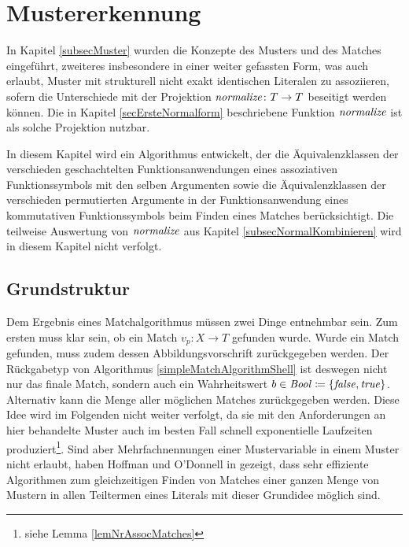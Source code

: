 

\chapter{Mustererkennung} \label{secPattermatching}

In Kapitel \ref{subsecMuster} wurden die Konzepte des Musters und des Matches eingeführt, zweiteres insbesondere in einer weiter gefassten Form, was auch erlaubt, Muster mit strukturell nicht exakt identischen Literalen zu assoziieren, sofern die Unterschiede mit der Projektion $\mathit{normalize} \colon T \rightarrow T$ beseitigt werden können. Die in Kapitel \ref{secErsteNormalform} beschriebene Funktion $\mathit{normalize}$ ist als solche Projektion nutzbar.  

In diesem Kapitel wird ein Algorithmus entwickelt, der die Äquivalenzklassen der verschieden geschachtelten Funktionsanwendungen eines assoziativen Funktionssymbols mit den selben Argumenten sowie die Äquivalenzklassen der verschieden permutierten Argumente in der Funktionsanwendung eines kommutativen Funktionssymbols beim Finden eines Matches berücksichtigt. Die teilweise Auswertung von $\mathit{normalize}$ aus Kapitel \ref{subsecNormalKombinieren} wird in diesem Kapitel nicht verfolgt.


\section{Grundstruktur} \label{subsecPatternmatchingGrundstruktur}

Dem Ergebnis eines Matchalgorithmus müssen zwei Dinge entnehmbar sein. Zum ersten muss klar sein, ob ein Match $v_p \colon X \rightarrow T$ gefunden wurde. Wurde ein Match gefunden, muss zudem dessen Abbildungsvorschrift zurückgegeben werden. Der Rückgabetyp von Algorithmus \ref{simpleMatchAlgorithmShell} ist deswegen nicht nur das finale Match, sondern auch ein Wahrheitswert $b \in \mathit{Bool} \coloneqq \{\mathit{false}, \mathit{true}\}$. Alternativ kann die Menge aller möglichen Matches zurückgegeben werden. Diese Idee wird im Folgenden nicht weiter verfolgt, da sie mit den Anforderungen an hier behandelte Muster auch im besten Fall schnell exponentielle Laufzeiten produziert\footnote{siehe Lemma \ref{lemNrAssocMatches}}. Sind aber Mehrfachnennungen einer Mustervariable in einem Muster nicht erlaubt, haben Hoffman und O'Donnell in \cite{patternMatchingInTrees} gezeigt, dass sehr effiziente Algorithmen zum gleichzeitigen Finden von Matches einer ganzen Menge von Mustern in allen Teiltermen eines Literals mit dieser Grundidee möglich sind.\\

